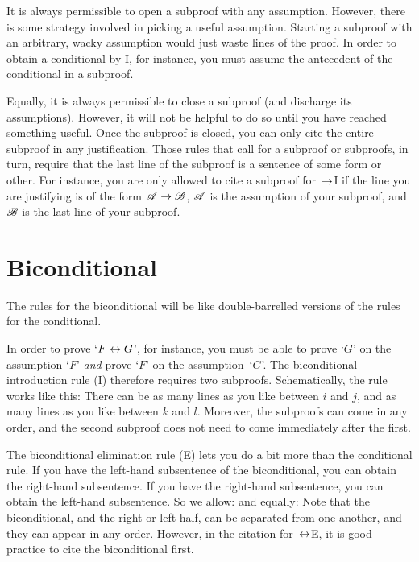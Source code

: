 It is always permissible to open a subproof with any assumption. However, there is some strategy involved in picking a useful assumption. Starting a subproof with an arbitrary, wacky assumption would just waste lines of the proof. In order to obtain a conditional by {\eif}I, for instance, you must assume the antecedent of the conditional in a subproof.

Equally, it is always permissible to close a subproof (and discharge
its assumptions). However, it will not be helpful to do so until you
have reached something useful. Once the subproof is closed, you can
only cite the entire subproof in any justification. Those rules that
call for a subproof or subproofs, in turn, require that the last line
of the subproof is a sentence of some form or other. For instance, you
are only allowed to cite a subproof for~$\rightarrow$I if the line you are
justifying is of the form $\mathscr{A} \rightarrow \mathscr{B}$, $\mathscr{A}$ is
the assumption of your subproof, and $\mathscr{B}$ is the last line of
your subproof.


\section{Biconditional}

The rules for the biconditional will be like double-barrelled versions
of the rules for the conditional.

In order to prove `$F \leftrightarrow G$', for instance, you must be able to
prove `$G$' on the assumption `$F$' \emph{and} prove `$F$' on the
assumption~`$G$'. The biconditional introduction rule ({\eiff}I)
therefore requires two subproofs. Schematically, the rule works like
this: 
There can be as many lines as you like between $i$ and $j$, and as many lines as you like between $k$ and $l$. Moreover, the subproofs can come in any order, and the second subproof does not need to come immediately after the first.

The biconditional elimination rule ({\eiff}E) lets you do a bit more than the conditional rule. If you have the left-hand subsentence of the biconditional, you can obtain the right-hand subsentence. If you have the right-hand subsentence, you can obtain the left-hand subsentence. So we allow:
and equally:
Note that the biconditional, and the right or left half, can be
separated from one another, and they can appear in any order. However,
in the citation for~$\leftrightarrow$E, it is good practice to cite the
biconditional first.

